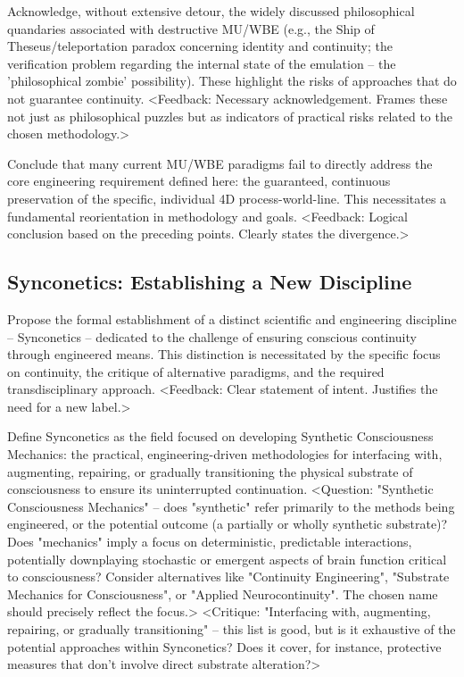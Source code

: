 \documentclass[10pt]{article}
\begin{document}
\begin{sloppypar}
  Acknowledge, without extensive detour, the widely discussed philosophical quandaries associated with destructive MU/WBE (e.g., the Ship of Theseus/teleportation paradox concerning identity and continuity; the verification problem regarding the internal state of the emulation – the 'philosophical zombie' possibility). These highlight the risks of approaches that do not guarantee continuity. <Feedback: Necessary acknowledgement. Frames these not just as philosophical puzzles but as indicators of practical risks related to the chosen methodology.>

  Conclude that many current MU/WBE paradigms fail to directly address the core engineering requirement defined here: the guaranteed, continuous preservation of the specific, individual 4D process-world-line. This necessitates a fundamental reorientation in methodology and goals. <Feedback: Logical conclusion based on the preceding points. Clearly states the divergence.>

  \subsection{Synconetics: Establishing a New Discipline}
  \label{sec:new-discipline}

  Propose the formal establishment of a distinct scientific and engineering discipline – Synconetics – dedicated to the challenge of ensuring conscious continuity through engineered means. This distinction is necessitated by the specific focus on continuity, the critique of alternative paradigms, and the required transdisciplinary approach. <Feedback: Clear statement of intent. Justifies the need for a new label.>

  Define Synconetics as the field focused on developing Synthetic Consciousness Mechanics: the practical, engineering-driven methodologies for interfacing with, augmenting, repairing, or gradually transitioning the physical substrate of consciousness to ensure its uninterrupted continuation. <Question: "Synthetic Consciousness Mechanics" – does "synthetic" refer primarily to the methods being engineered, or the potential outcome (a partially or wholly synthetic substrate)? Does "mechanics" imply a focus on deterministic, predictable interactions, potentially downplaying stochastic or emergent aspects of brain function critical to consciousness? Consider alternatives like "Continuity Engineering", "Substrate Mechanics for Consciousness", or "Applied Neurocontinuity". The chosen name should precisely reflect the focus.> <Critique: "Interfacing with, augmenting, repairing, or gradually transitioning" – this list is good, but is it exhaustive of the potential approaches within Synconetics? Does it cover, for instance, protective measures that don't involve direct substrate alteration?>


\end{sloppypar}
\end{document}
